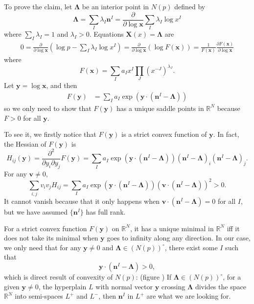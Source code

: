 \documentclass[12pt]{article}
\theoremstyle{definition}
\theoremstyle{plain}
\begin{document}
To prove the claim, let $\mathbf{\Lambda}$ be an interior point in $N(p)$ defined by 
\[
	\mathbf \Lambda=\sum_{I}\lambda_I\mathbf n^I
	=\frac{\partial}{\partial \log \mathbf x}\sum_{I}\lambda_I \log x^I
\]
where $\sum_I \lambda_I=1$ and $\lambda_I > 0$. Equations $\mathbf X(x)=\mathbf \Lambda$ are 
\[
\begin{aligned}
	0=\frac{\partial }{\partial \log \mathbf x}\left(
	\log p-\sum_{I}\lambda_I \log x^I
	\right)=\frac{\partial }{\partial \log \mathbf x}\left(
	\log F(\mathbf x)
	\right)=\frac{1}{F(\mathbf x)}\frac{\partial F(\mathbf x)}{\partial \log \mathbf x}
\end{aligned}
\]
where
\[
	F(\mathbf x)=\sum_I a_I x^I\prod_J (x^{-J})^{\lambda_J}.
\]
Let $\mathbf y=\log \mathbf x$, and then
\[
	\begin{aligned}
		F(\mathbf y)
		&=\sum_I a_I \exp\left(\mathbf{y}\cdot \left(\mathbf{n}^I-\mathbf{\Lambda}\right)\right)
	\end{aligned}
\]
so we only need to show that $F(\mathbf y)$ has a unique saddle points in $\mathbb R^N$ because $F>0$ for all $\mathbf y$.

 To see it, we firstly notice that $F(\mathbf y)$ is a strict convex function of $\mathbf y$. In fact, the Hessian of $F(\mathbf y)$ is 
\[
	H_{ij}(\mathbf y)=\frac{\partial^2}{\partial y_i\partial y_j}F(\mathbf y)=\sum_I a_I \exp\left(\mathbf{y}\cdot \left(\mathbf{n}^I-\mathbf{\Lambda}\right)\right)\left(\mathbf{n}^I-\mathbf{\Lambda}\right)_i\left(\mathbf{n}^I-\mathbf{\Lambda}\right)_j.
\]
For any $\mathbf v\neq 0$, 
\[
	\sum_{i,j}v_iv_jH_{ij}=\sum_I a_I \exp\left(\mathbf{y}\cdot \left(\mathbf{n}^I-\mathbf{\Lambda}\right)\right) \left(\mathbf v\cdot (\mathbf{n}^I-\mathbf{\Lambda})\right)^2 >0.
\]
It cannot vanish because that it only happens when $\mathbf v\cdot (\mathbf{n}^I-\mathbf{\Lambda})=0$ for all $I$, but we have assumed $\{\mathbf n^I\}$ has full rank.

For a strict convex function $F(\mathbf y)$ on $\mathbb R^N$, it has a unique minimal in $\mathbb R^N$ iff it does not take its minimal when $\mathbf{y}$ goes to infinity along any direction. In our case, we only need that for any $\mathbf{y}\neq 0$ and $\mathbf\Lambda \in (N(p))^\circ $, there exist some $I$ such that  
\[
	\mathbf{y}\cdot (\mathbf{n}^I-\mathbf{\Lambda})>0,
\]
which is direct result of convexity of $N(p)$: (figure \cite{}) If $\mathbf\Lambda \in (N(p))^\circ$, for a given $\mathbf y\neq 0$, the hyperplain $L$ with normal vector $\mathbf y$ crossing $\mathbf \Lambda$ divides the space $\mathbb R^N$ into semi-spaces $L^+$ and $L^-$, then $\mathbf{n}^I$ in $L^+$ are what we are looking for.
\end{document}

